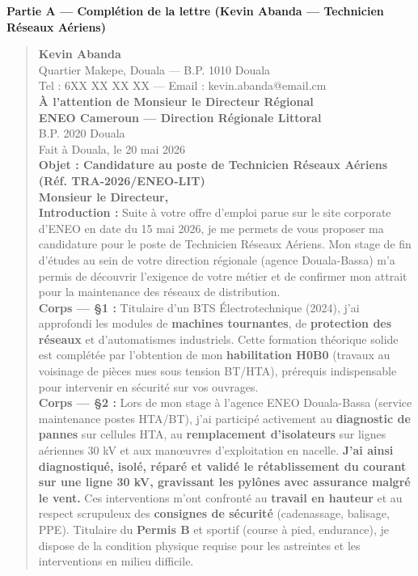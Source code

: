 \documentclass[11pt]{article}
\begin{document}
\begin{corrige}
\textbf{Partie A — Complétion de la lettre (Kevin Abanda — Technicien Réseaux Aériens)}
\begin{quote}
\textbf{Kevin Abanda} \\
Quartier Makepe, Douala — B.P. 1010 Douala \\
Tel : 6XX XX XX XX — Email : kevin.abanda@email.cm \\[0.5em]
\textbf{À l'attention de Monsieur le Directeur Régional} \\
\textbf{ENEO Cameroun — Direction Régionale Littoral} \\
B.P. 2020 Douala \\[0.5em]
Fait à Douala, le 20 mai 2026 \\[0.5em]
\textbf{Objet : Candidature au poste de Technicien Réseaux Aériens (Réf. TRA-2026/ENEO-LIT)} \\[0.5em]
\textbf{Monsieur le Directeur,} \\[0.5em]
\textbf{Introduction :} Suite à votre offre d'emploi parue sur le site corporate d'ENEO en date du 15 mai 2026, je me permets de vous proposer ma candidature pour le poste de Technicien Réseaux Aériens. Mon stage de fin d'études au sein de votre direction régionale (agence Douala-Bassa) m'a permis de découvrir l'exigence de votre métier et de confirmer mon attrait pour la maintenance des réseaux de distribution. \\[0.5em]
\textbf{Corps — §1 :} Titulaire d'un BTS Électrotechnique (2024), j'ai approfondi les modules de \textbf{machines tournantes}, de \textbf{protection des réseaux} et d'automatismes industriels. Cette formation théorique solide est complétée par l'obtention de mon \textbf{habilitation H0B0} (travaux au voisinage de pièces nues sous tension BT/HTA), prérequis indispensable pour intervenir en sécurité sur vos ouvrages. \\[0.5em]
\textbf{Corps — §2 :} Lors de mon stage à l'agence ENEO Douala-Bassa (service maintenance postes HTA/BT), j'ai participé activement au \textbf{diagnostic de pannes} sur cellules HTA, au \textbf{remplacement d'isolateurs} sur lignes aériennes 30 kV et aux manœuvres d'exploitation en nacelle. \textbf{J'ai ainsi diagnostiqué, isolé, réparé et validé le rétablissement du courant sur une ligne 30 kV, gravissant les pylônes avec assurance malgré le vent.} Ces interventions m'ont confronté au \textbf{travail en hauteur} et au respect scrupuleux des \textbf{consignes de sécurité} (cadenassage, balisage, PPE). Titulaire du \textbf{Permis B} et sportif (course à pied, endurance), je dispose de la condition physique requise pour les astreintes et les interventions en milieu difficile. \\[0.5em]

\end{quote}
\end{corrige}
\end{document}
